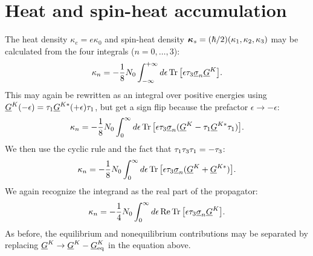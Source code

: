 \section{Heat and spin-heat accumulation}
The heat density $\kappa_{e} = e\kappa_0$ and spin-heat density $\bm{\kappa}_{s} = (\hbar/2)(\kappa_1, \kappa_2, \kappa_3)$ may be calculated from the four integrals ($n=0,\ldots,3$):
\begin{equation}
  \kappa_n = -\frac{1}{8}N_0 \int_{-\infty}^{+\infty} d\epsilon \operatorname{Tr}\big[ \epsilon\tau_{3}\underline{\sigma}_{n} \underline{G}^K \big].
\end{equation}
This may again be rewritten as an integral over positive energies using $\underline{G}^K(-\epsilon) = \tau_{1} \underline{G}^{K*}(+\epsilon) \tau_{1}$, but get a sign flip because the prefactor $\epsilon \rightarrow -\epsilon$:
\begin{equation}
  \kappa_n = -\frac{1}{8}N_0 \int_{0}^{\infty} d\epsilon \operatorname{Tr}\big[ \epsilon\tau_{3}\underline{\sigma}_{n} (\underline{G}^K - \tau_{1} \underline{G}^{K*} \tau_{1}) \big].
\end{equation}
We then use the cyclic rule and the fact that $\tau_{1}\tau_{3}\tau_{1} = -\tau_{3}$:
\begin{equation}
  \kappa_n = -\frac{1}{8}N_0 \int_{0}^{\infty} d\epsilon \operatorname{Tr}\big[ \epsilon\tau_{3}\underline{\sigma}_{n} (\underline{G}^K + \underline{G}^{K*}) \big].
\end{equation}
We again recognize the integrand as the real part of the propagator:
\begin{equation}
  \kappa_n = -\frac{1}{4}N_0 \int_{0}^{\infty} d\epsilon \operatorname{Re}\operatorname{Tr}\big[ \epsilon\tau_{3}\underline{\sigma}_{n} \underline{G}^K \big].
\end{equation}
As before, the equilibrium and nonequilibrium contributions may be separated by replacing $\underline{G}^K \rightarrow \underline{G}^K - \underline{G}^K_\text{eq}$ in the equation above.



\clearpage
